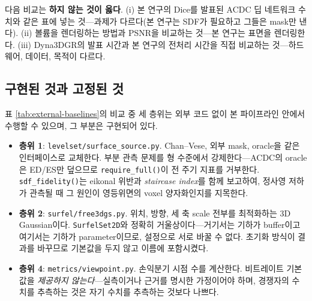 

다음 비교는 \textbf{하지 않는 것이 옳다}. (i) 본 연구의 Dice를 발표된 ACDC 딥
네트워크 수치와 같은 표에 넣는 것---과제가 다르다(본 연구는 SDF가 필요하고 그들은
mask만 낸다). (ii) 볼륨을 렌더링하는 방법과 PSNR을 비교하는 것---본 연구는 표면을
렌더링한다. (iii) Dyna3DGR의 발표 시간과 본 연구의 전처리 시간을 직접 비교하는
것---하드웨어, 데이터, 목적이 다르다.

\subsection{구현된 것과 고정된 것}
\label{sec:comparison-impl}

표 \ref{tab:external-baselines}의 비교 중 세 층위는 외부 코드 없이 본 파이프라인
안에서 수행할 수 있으며, 그 부분은 구현되어 있다.

\begin{itemize}[leftmargin=2em]
  \item \textbf{층위 1}: \texttt{levelset/surface\_source.py}. Chan--Vese, 외부 mask,
  oracle을 같은 인터페이스로 교체한다. 부분 관측 문제를 형 수준에서 강제한다---ACDC의
  oracle은 ED/ES만 덮으므로 \texttt{require\_full()}이 전 주기 지표를 거부한다.
  \texttt{sdf\_fidelity()}는 eikonal 위반과 \emph{staircase index}를 함께 보고하여,
  정사영 저하가 관측될 때 그 원인이 영등위면의 voxel 양자화인지를 지목한다.
  \item \textbf{층위 2}: \texttt{surfel/free3dgs.py}. 위치, 방향, 세 축 scale 전부를
  최적화하는 3D Gaussian이다. \texttt{SurfelSet2D}와 정확히 거울상이다---거기서는
  기하가 buffer이고 여기서는 기하가 parameter이므로, 설정으로 서로 바꿀 수 없다.
  초기화 방식이 결과를 바꾸므로 기본값을 두지 않고 이름에 포함시켰다.
  \item \textbf{층위 4}: \texttt{metrics/viewpoint.py}. 손익분기 시점 수를 계산한다.
  비트레이트 기본값을 \emph{제공하지 않는다}---실측이거나 근거를 명시한 가정이어야
  하며, 경쟁자의 수치를 추측하는 것은 자기 수치를 추측하는 것보다 나쁘다.
\end{itemize}


